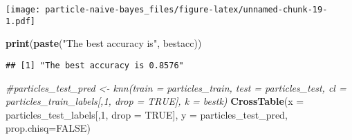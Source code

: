\documentclass[
]{article}
\newenvironment{Shaded}{\begin{snugshade}}{\end{snugshade}}
\newcommand{\CommentTok}[1]{\textcolor[rgb]{0.56,0.35,0.01}{\textit{#1}}}
\newcommand{\DataTypeTok}[1]{\textcolor[rgb]{0.13,0.29,0.53}{#1}}
\newcommand{\DecValTok}[1]{\textcolor[rgb]{0.00,0.00,0.81}{#1}}
\newcommand{\KeywordTok}[1]{\textcolor[rgb]{0.13,0.29,0.53}{\textbf{#1}}}
\newcommand{\NormalTok}[1]{#1}
\newcommand{\OtherTok}[1]{\textcolor[rgb]{0.56,0.35,0.01}{#1}}
\newcommand{\StringTok}[1]{\textcolor[rgb]{0.31,0.60,0.02}{#1}}
\begin{document}
\texttt{[image: particle-naive-bayes\_files/figure-latex/unnamed-chunk-19-1.pdf]}

\begin{Shaded}
\begin{Highlighting}[]
\KeywordTok{print}\NormalTok{(}\KeywordTok{paste}\NormalTok{(}\StringTok{"The best accuracy is"}\NormalTok{, bestacc))}
\end{Highlighting}
\end{Shaded}

\begin{verbatim}
## [1] "The best accuracy is 0.8576"
\end{verbatim}

\begin{Shaded}
\begin{Highlighting}[]
\CommentTok{#particles_test_pred <- knn(train = particles_train, test = particles_test, cl = particles_train_labels[,1, drop = TRUE], k = bestk)}
\KeywordTok{CrossTable}\NormalTok{(}\DataTypeTok{x =}\NormalTok{ particles_test_labels[,}\DecValTok{1}\NormalTok{, }\DataTypeTok{drop =} \OtherTok{TRUE}\NormalTok{], }\DataTypeTok{y =}\NormalTok{ particles_test_pred, }\DataTypeTok{prop.chisq=}\OtherTok{FALSE}\NormalTok{)}
\end{Highlighting}
\end{Shaded}
\end{document}
